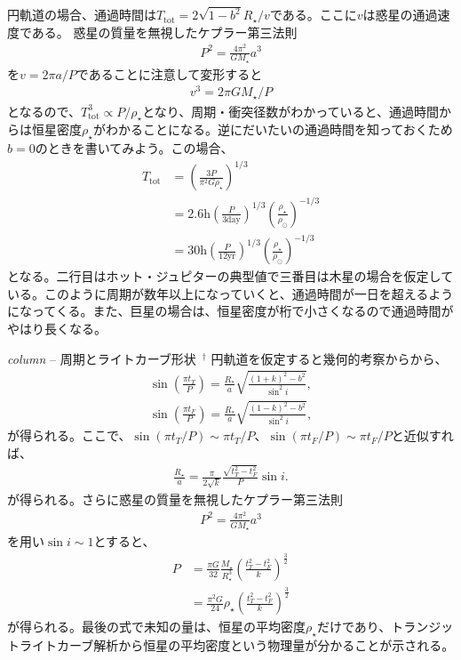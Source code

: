 円軌道の場合、通過時間は$T_\mathrm{tot} = 2 \sqrt{1-b^2} R_\star/v$である。ここに$v$は惑星の通過速度である。
惑星の質量を無視したケプラー第三法則
\begin{align}
 P^2 = \frac{4 \pi^2}{G M_\star} a^3 
\end{align}
を$v=2 \pi a/P$であることに注意して変形すると
\begin{align}
v^3=2 \pi G M_\star/P 
\end{align}
となるので、$T_\mathrm{tot}^3 \propto  P/\rho_\star $となり、周期・衝突径数がわかっていると、通過時間からは恒星密度$\rho_\star$がわかることになる。逆にだいたいの通過時間を知っておくため $b=0$のときを書いてみよう。この場合、
\begin{align}
T_\mathrm{tot}  &= \left( \frac{3  P}{\pi^2 G \rho_\star} \right)^{1/3} \\
&= 2.6 \mathrm{h} \left(\frac{P}{3 \mathrm{day}}\right)^{1/3} \left(\frac{\rho_\star}{\rho_\odot}\right)^{-1/3} \\
&= 30  \mathrm{h} \left(\frac{P}{12 \mathrm{yr}}\right)^{1/3} \left(\frac{\rho_\star}{\rho_\odot}\right)^{-1/3} 
\end{align}
となる。二行目はホット・ジュピターの典型値で三番目は木星の場合を仮定している。このように周期が数年以上になっていくと、通過時間が一日を超えるようになってくる。また、巨星の場合は、恒星密度が桁で小さくなるので通過時間がやはり長くなる。

\begin{itembox}{{\it column} -- 周期とライトカーブ形状 $\,^\dagger$}
\footnotesize
円軌道を仮定すると幾何的考察からから、
\begin{align}
\label{eq:totald}
\sin{ \left( \frac{\pi t_T}{P} \right)}  = \frac{R_*}{a} \sqrt{\frac{(1+k)^2 - b^2}{\sin^2{i}}}, \\
\label{eq:totalf}
\sin{ \left( \frac{\pi t_F}{P} \right)}  = \frac{R_*}{a} \sqrt{\frac{(1-k)^2 - b^2}{\sin^2{i}}},
\end{align}
が得られる。ここで、$\sin{(\pi t_T/P)} \sim \pi t_T/P$、$\sin{(\pi t_F/P)} \sim \pi t_F/P$と近似すれば、
\begin{align}
\label{eq:ra}
\frac{R_\star}{a} = \frac{\pi}{2 \sqrt{k}} \frac{\sqrt{t_T^2 - t_F^2}}{P} \sin{i}.
\end{align}
が得られる。さらに惑星の質量を無視したケプラー第三法則
\begin{align}
 P^2 = \frac{4 \pi^2}{G M_\star} a^3 
\end{align}
を用い$\sin{i} \sim 1$とすると、
\begin{align}
\label{eq:pk}
P &= \frac{\pi G}{32} \frac{M_\star}{R_\star^3} \left( \frac{t_T^2 -t_F^2}{k} \right)^{\frac{3}{2}} \\
 &= \frac{\pi^2 G}{24} \rho_\star \left( \frac{t_T^2 -t_F^2}{k} \right)^{\frac{3}{2}} 
\end{align}
が得られる。最後の式で未知の量は、恒星の平均密度$\rho_\star$だけであり、トランジットライトカーブ解析から恒星の平均密度という物理量が分かることが示される。
\end{itembox}

